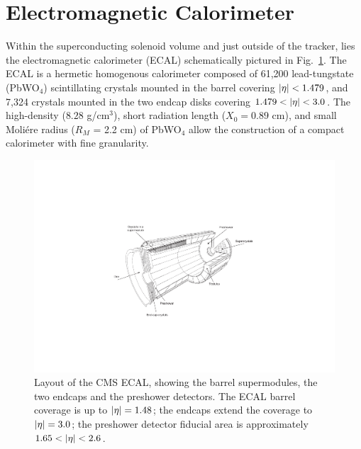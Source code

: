 

\section{Electromagnetic Calorimeter}
\label{sec:ecal}

Within the superconducting solenoid volume and just outside of the
tracker, lies the electromagnetic calorimeter (ECAL) schematically
pictured in Fig.~\ref{fig:ecal}. The ECAL is a hermetic homogenous
calorimeter composed of 61,200 lead-tungstate (PbWO$_{4}$) scintillating crystals mounted in
the barrel covering $\lvert \eta \rvert<1.479$, and 7,324 crystals mounted in the two endcap disks
covering $1.479<\lvert \eta \rvert<3.0$. The high-density ($8.28$ g/cm$^{3}$),
short radiation length ($X_0 = 0.89$ cm), and small Moli\'{e}re radius
($R_M$ = 2.2 cm) of PbWO$_{4}$ allow the construction of a compact
calorimeter with fine granularity.

\begin{figure}
\includegraphics[width=.9\textwidth]{figs/cms/calorimeter.pdf}\centering
\caption{Layout of the CMS ECAL, showing the barrel supermodules, the
  two endcaps and the preshower detectors. The ECAL barrel coverage is
  up to $\lvert \eta \rvert = 1.48$; the endcaps extend the coverage to $\lvert \eta \rvert = 3.0$; the
  preshower detector fiducial area is approximately $1.65 < \lvert \eta \rvert
  < 2.6$.\label{fig:ecal}}
\end{figure}

